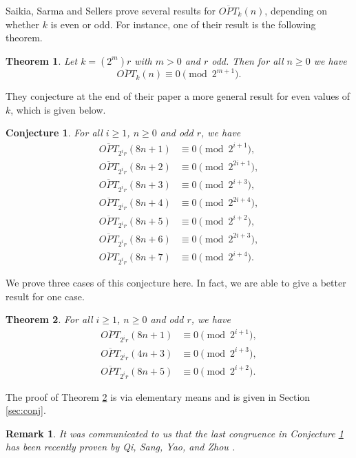 \documentclass[12pt,reqno]{amsart}
\numberwithin{equation}{section}
\newcommand{\opt}{\overline{OPT}}
\newtheorem{theorem}{Theorem}[section]
\newtheorem{conjecture}{Conjecture}[section]
\newtheorem{remark}{Remark}[section]
\begin{document}
Saikia, Sarma and Sellers \cite{SSS} prove several results for $\opt_k(n)$, depending on whether $k$ is even or odd. For instance, one of their result is the following theorem.
\begin{theorem}\cite[Theorem 6]{SSS}\label{thm:k2}
    Let $k=(2^m)r$ with $m>0$ and $r$ odd. Then for all $n\geq 0$ we have
    \[
    \opt_k(n)\equiv 0 \pmod{2^{m+1}}.
    \]
\end{theorem}
\noindent They \cite{SSS} conjecture at the end of their paper a more general result for even values of $k$, which is given below.
\begin{conjecture}\cite[Conjecture 1]{SSS}\label{conj2i}
    For all $i\geq1$, $n\geq 0$ and odd $r$, we have
    \begin{align*}
        \opt_{2^ir}(8n+1)&\equiv0\pmod{2^{i+1}},\\
        \opt_{2^ir}(8n+2)&\equiv0\pmod{2^{2i+1}},\\
        \opt_{2^ir}(8n+3)&\equiv0\pmod{2^{i+3}},\\
        \opt_{2^ir}(8n+4)&\equiv0\pmod{2^{2i+4}},\\
        \opt_{2^ir}(8n+5)&\equiv0\pmod{2^{i+2}},\\
        \opt_{2^ir}(8n+6)&\equiv0\pmod{2^{2i+3}},\\
        \opt_{2^ir}(8n+7)&\equiv0\pmod{2^{i+4}}.
    \end{align*}
\end{conjecture}
\noindent We prove three cases of this conjecture here. In fact, we are able to give a better result for one case.
\begin{theorem}\label{thm:conj}
     For all $i\geq1$, $n\geq 0$ and odd $r$, we have
    \begin{align}
    \opt_{2^ir}(8n+1)&\equiv0\pmod{2^{i+1}},\label{conjp-1}\\
    \opt_{2^ir}(4n+3)&\equiv0\pmod{2^{i+3}},\label{conjp-2}\\
    \opt_{2^ir}(8n+5)&\equiv0\pmod{2^{i+2}}.\label{conjp-3}
    \end{align}
\end{theorem}
\noindent The proof of Theorem \ref{thm:conj} is via elementary means and is given in Section \ref{sec:conj}.

\begin{remark}
    It was communicated to us that the last congruence in Conjecture \ref{conj2i} has been recently proven by Qi, Sang, Yao, and Zhou \cite{QiSangYaoZhou}.
\end{remark}
\end{document}

